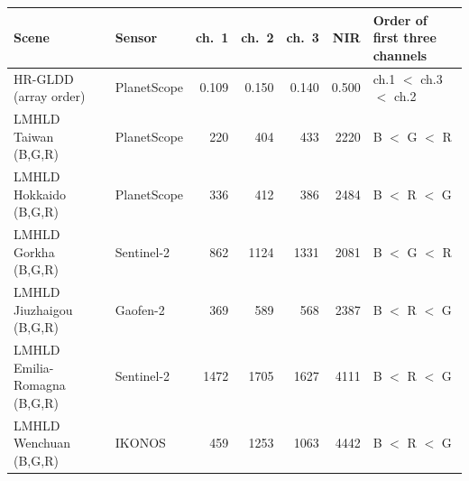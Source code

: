 \begin{tabular}{llrrrrl}
\toprule
Scene & Sensor & ch.\ 1 & ch.\ 2 & ch.\ 3 & NIR & Order of first three channels \\
\midrule
HR-GLDD (array order) & PlanetScope & 0.109 & 0.150 & 0.140 & 0.500 & ch.1 $<$ ch.3 $<$ ch.2 \\
LMHLD Taiwan (B,G,R) & PlanetScope & 220 & 404 & 433 & 2220 & B $<$ G $<$ R \\
LMHLD Hokkaido (B,G,R) & PlanetScope & 336 & 412 & 386 & 2484 & B $<$ R $<$ G \\
LMHLD Gorkha (B,G,R) & Sentinel-2 & 862 & 1124 & 1331 & 2081 & B $<$ G $<$ R \\
LMHLD Jiuzhaigou (B,G,R) & Gaofen-2 & 369 & 589 & 568 & 2387 & B $<$ R $<$ G \\
LMHLD Emilia-Romagna (B,G,R) & Sentinel-2 & 1472 & 1705 & 1627 & 4111 & B $<$ R $<$ G \\
LMHLD Wenchuan (B,G,R) & IKONOS & 459 & 1253 & 1063 & 4442 & B $<$ R $<$ G \\
\bottomrule
\end{tabular}
